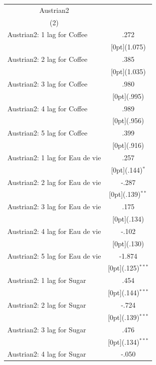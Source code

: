 \documentclass[12pt,a4paper,titlepage]{article}
\begin{document}
{\newpage
{} \label{tab:title}
\begin{tabular*}{\textwidth}{@{\extracolsep{\fill}}lc}	
	\multicolumn{1}{c}{Austrian2} \\
\cline{2-2}	
	\multicolumn{1}{c}{(2)} \\
\hline	
Austrian2: 1 lag for Coffee &	.272 \\
&	\raisebox{.7ex}[0pt]{\scriptsize (1.075)} \\
Austrian2: 2 lag for Coffee &	.385 \\
&	\raisebox{.7ex}[0pt]{\scriptsize (1.035)} \\
Austrian2: 3 lag for Coffee &	.980 \\
&	\raisebox{.7ex}[0pt]{\scriptsize (.995)} \\
Austrian2: 4 lag for Coffee &	.989 \\
&	\raisebox{.7ex}[0pt]{\scriptsize (.956)} \\
Austrian2: 5 lag for Coffee &	.399 \\
&	\raisebox{.7ex}[0pt]{\scriptsize (.916)} \\
Austrian2: 1 lag for Eau de vie &	.257 \\
&	\raisebox{.7ex}[0pt]{\scriptsize (.144)$^{*}$} \\
Austrian2: 2 lag for Eau de vie &	-.287 \\
&	\raisebox{.7ex}[0pt]{\scriptsize (.139)$^{**}$} \\
Austrian2: 3 lag for Eau de vie &	.175 \\
&	\raisebox{.7ex}[0pt]{\scriptsize (.134)} \\
Austrian2: 4 lag for Eau de vie &	-.102 \\
&	\raisebox{.7ex}[0pt]{\scriptsize (.130)} \\
Austrian2: 5 lag for Eau de vie &	-1.874 \\
&	\raisebox{.7ex}[0pt]{\scriptsize (.125)$^{***}$} \\
Austrian2: 1 lag for Sugar &	.454 \\
&	\raisebox{.7ex}[0pt]{\scriptsize (.144)$^{***}$} \\
Austrian2: 2 lag for Sugar &	-.724 \\
&	\raisebox{.7ex}[0pt]{\scriptsize (.139)$^{***}$} \\
Austrian2: 3 lag for Sugar &	.476 \\
&	\raisebox{.7ex}[0pt]{\scriptsize (.134)$^{***}$} \\
Austrian2: 4 lag for Sugar &	-.050 \\

\end{tabular*}}
\end{document}
